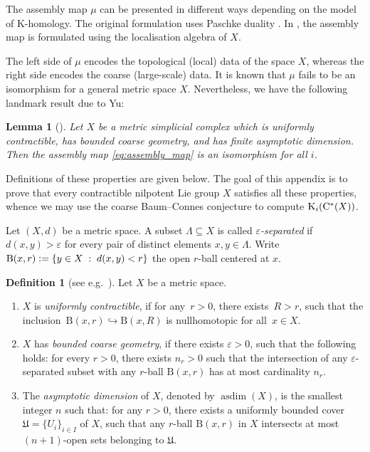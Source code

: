 \documentclass{amsart}
\numberwithin{figure}{section}
\numberwithin{equation}{section}
\numberwithin{table}{section}
\theoremstyle{plain}
\newtheorem{lemma}[equation]{Lemma}
\theoremstyle{definition}
\newtheorem{definition}[equation]{Definition}
\theoremstyle{remark}
\theoremstyle{nonumber}
\newcommand{\K}{\relax\ifmmode\operatorname{K}\else\textup{K}\fi}
\newcommand{\Cst}{\relax\ifmmode\mathrm{C}^*\else\textup{C*}\fi}
\newcommand{\Ball}{\mathrm{B}} %
\newcommand{\defeq}{\mathrel{\vcentcolon=}}
\begin{document}
The assembly map \( \mu \) can be presented in different ways depending on
the model of K-homology. The original formulation uses Paschke duality
\cite{Higson-Roe:Coarse_Baum-Connes}. In
\cite{Yu:Localization_algebras_coarse_Baum-Connes}, the assembly map 
is formulated using the localisation algebra of \( X \). 

The left side of \( \mu \) encodes the topological (local) data of the
space \( X \), whereas the right side encodes the coarse (large-scale)
data. It is known that \( \mu \) 
fails to be an isomorphism for a general metric space
\( X \). Nevertheless, we have the following landmark result due to Yu:

\begin{lemma}[]
\label{lem:Yu_theorem}
Let $X$ be a metric simplicial complex which is 
uniformly contractible, has bounded coarse geometry, 
and has finite asymptotic dimension. Then the assembly map
\eqref{eq:assembly_map} is an isomorphism for all \( i \). 
\end{lemma}

Definitions of these properties are given below. The goal of this appendix
is to prove that every contractible nilpotent Lie group \( X \) satisfies
all these properties, whence we may use the coarse Baum--Connes conjecture
to compute \( \K_i(\Cst(X)) \).  

Let \( (X,d) \) be a metric space. 
A subset \( \Lambda\subseteq X \) is called \emph{\( \varepsilon \)-separated} if \( d(x,y)>\varepsilon \)
for every pair of distinct elements \( x,y\in\Lambda \).  
Write \( \Ball(x,r)\defeq \{y\in X\;:\;
d(x,y)<r\} \) the open \( r \)-ball centered at \( x \). 

\begin{definition}[see e.g.~\cite{Higson-Roe:Coarse_Baum-Connes}]
Let \( X \) be a metric space.  
\begin{enumerate}
\item $X$ is \emph{uniformly contractible}, if for any~$r>0$, there
exists~$R>r$, such that the
inclusion~$\Ball(x,r)\hookrightarrow\Ball(x,R)$ is nullhomotopic for
all~$x\in X$.
\item \( X \) has \emph{bounded coarse geometry}, if there exists \(
\varepsilon>0 \), such that the following holds: 
for every \( r>0 \), there exists \( n_r>0
\) such that the intersection of any 
\( \varepsilon \)-separated subset with any \( r \)-ball \( \Ball(x,r) \)
has at most cardinality \( n_r \). 
\item The \emph{asymptotic dimension} of \( X \), denoted by \(
\operatorname{asdim}(X) \), is the smallest integer \(
n\) such that: for any \( r>0 \), there exists a uniformly bounded cover \(
\mathfrak{U}=\{U_i\}_{i\in I}\) of \( X \), such that any \( r \)-ball \(
\Ball(x,r)
\) in \( X \) intersects at most \( (n+1) \)-open sets belonging to \(
\mathfrak{U} \).   
\end{enumerate}
\end{definition}
\end{document}
